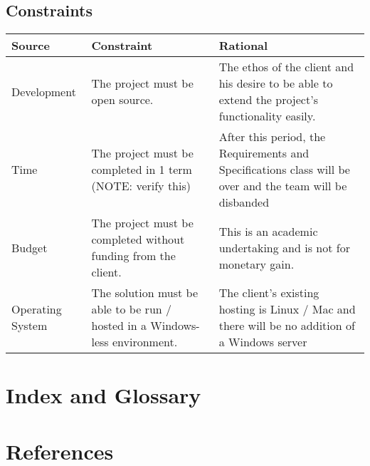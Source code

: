 \documentclass{article}
\begin{document}
\subsection{Constraints}
\begin{tabular}{ | p{1.2in} | p{2.4in} | p{2.4in} | }
\hline
Source & Constraint & Rational\\
\hline
Development & The project must be open source. & The ethos of the client and his desire to be able to extend the project’s functionality easily.\\
\hline
Time & The project must be completed in 1 term (NOTE: verify this) & After this period, the Requirements and Specifications class will be over and the team will be disbanded\\
\hline
Budget & The project must be completed without funding from the client. & This is an academic undertaking and is not for monetary gain.\\
\hline
Operating System & The solution must be able to be run / hosted in a Windows-less environment. & The client’s existing hosting is Linux / Mac and there will be no addition of a Windows server\\
\hline
\end{tabular}

\section{Index and Glossary}

\section{References}
\end{document}
